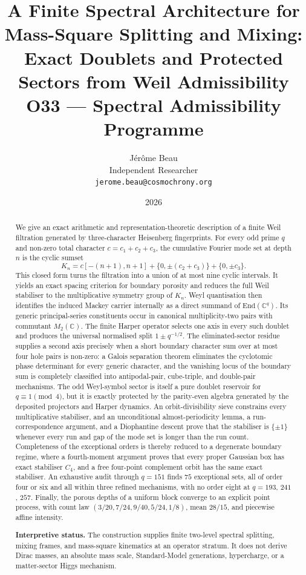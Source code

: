 \documentclass[11pt,a4paper]{article}
\title{\textbf{A Finite Spectral Architecture for Mass-Square Splitting and Mixing:}\\
\textbf{Exact Doublets and Protected Sectors from Weil Admissibility}\\[0.5em]
\large O33 --- Spectral Admissibility Programme}
\author{J\'er\^ome Beau\\[0.3em]
\small Independent Researcher\\
\small \texttt{jerome.beau@cosmochrony.org}}
\date{2026}
\theoremstyle{definition}
\theoremstyle{remark}
\newcommand{\C}{\mathbb{C}}
\newcommand{\End}{\mathrm{End}}
\begin{document}
\maketitle

\begin{abstract}
We give an exact arithmetic and representation-theoretic description of a finite Weil
filtration generated by three-character Heisenberg fingerprints.
For every odd prime $q$ and non-zero total character $c=c_1+c_2+c_3$, the cumulative Fourier
mode set at depth $n$ is the cyclic sumset
\[
  K_n=c[-(n+1),n+1]+\{0,\pm(c_2+c_3)\}+\{0,\pm c_3\}.
\]
This closed form turns the filtration into a union of at most nine cyclic intervals.
It yields an exact spacing criterion for boundary porosity and reduces the full Weil
stabiliser to the multiplicative symmetry group of $K_n$.
Weyl quantisation then identifies the induced Mackey carrier internally as a direct summand
of $\End(\C^q)$.
Its generic principal-series constituents occur in canonical multiplicity-two pairs with
commutant $M_2(\C)$.
The finite Harper operator selects one axis in every such doublet and produces the universal
normalised split $1\pm q^{-1/2}$.
The eliminated-sector residue supplies a second axis precisely when a short boundary
character sum over at most four hole pairs is non-zero: a Galois separation theorem
eliminates the cyclotomic phase determinant for every generic character, and the vanishing
locus of the boundary sum is completely classified into antipodal-pair, cube-triple, and
double-pair mechanisms.
The odd Weyl-symbol sector is itself a pure doublet reservoir for $q\equiv1\pmod4$, but it is
exactly protected by the parity-even algebra generated by the deposited projectors and
Harper dynamics.
An orbit-divisibility sieve constrains every multiplicative stabiliser, and an
unconditional almost-periodicity lemma, a run-correspondence argument, and a Diophantine
descent prove that the stabiliser is $\{\pm1\}$ whenever every run and gap of the mode set
is longer than the run count.
Completeness of the exceptional orders is thereby reduced to a degenerate boundary regime,
where a fourth-moment argument proves that every proper Gaussian box has exact stabiliser
$C_4$, and a free four-point complement orbit has the same exact stabiliser.
An exhaustive audit through $q=151$ finds $75$ exceptional sets, all of order four or six
and all within three refined mechanisms, with no order eight at $q=193$, $241$, $257$.
Finally, the porous depths of a uniform block converge to an explicit point process, with
count law $(3/20,7/24,9/40,5/24,1/8)$, mean $28/15$, and piecewise affine intensity.

\noindent\textbf{Interpretive status.}
The construction supplies finite two-level spectral splitting, mixing frames, and
mass-square kinematics at an operator stratum.
It does not derive Dirac masses, an absolute mass scale, Standard-Model generations,
hypercharge, or a matter-sector Higgs mechanism.
\end{abstract}
\end{document}
